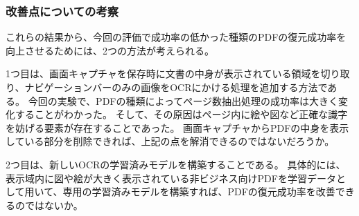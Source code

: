 \subsubsection{改善点についての考察}
これらの結果から、今回の評価で成功率の低かった種類のPDFの復元成功率を向上させるためには、2つの方法が考えられる。

1つ目は、画面キャプチャを保存時に文書の中身が表示されている領域を切り取り、ナビゲーションバーのみの画像をOCRにかける処理を追加する方法である。
今回の実験で、PDFの種類によってページ数抽出処理の成功率は大きく変化することがわかった。
そして、その原因はページ内に絵や図など正確な識字を妨げる要素が存在することであった。
画面キャプチャからPDFの中身を表示している部分を削除できれば、上記の点を解消できるのではないだろうか。

2つ目は、新しいOCRの学習済みモデルを構築することである。
具体的には、表示域内に図や絵が大きく表示されている非ビジネス向けPDFを学習データとして用いて、専用の学習済みモデルを構築すれば、PDFの復元成功率を改善できるのではないか。
